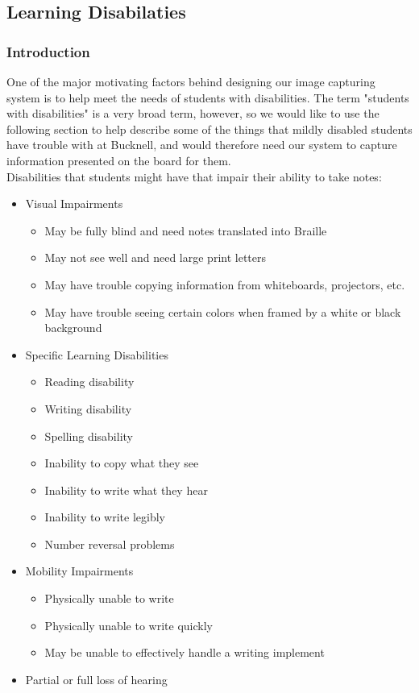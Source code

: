 \documentclass{article}
\begin{document}
\subsection*{Learning Disabilaties}
        \subsubsection*{Introduction}
One of the major motivating factors behind designing our image capturing system is to help meet the needs of students with disabilities. The term "students with disabilities" is a very broad term, however, so we would like to use the following section to help describe some of the things that mildly disabled students have trouble with at Bucknell, and would therefore need our system to capture information presented on the board for them. \\
Disabilities that students might have that impair their ability to take notes: \cite{disability}
    \begin{itemize}
        \item Visual Impairments
        \begin{itemize}
            \item May be fully blind and need notes translated into Braille
            \item May not see well and need large print letters
            \item May have trouble copying information from whiteboards, projectors, etc.
            \item May have trouble seeing certain colors when framed by a white or black background
        \end{itemize}
        \item Specific Learning Disabilities
        \begin{itemize}
            \item Reading disability
            \item Writing disability
            \item Spelling disability
            \item Inability to copy what they see
            \item Inability to write what they hear
            \item Inability to write legibly
            \item Number reversal problems
        \end{itemize}
        \item Mobility Impairments
        \begin{itemize}
            \item Physically unable to write
            \item Physically unable to write quickly
            \item May be unable to effectively handle a writing implement
        \end{itemize}
        \item Partial or full loss of hearing
    \end{itemize}
\end{document}
